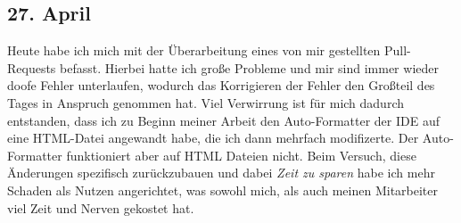 \subsection{27. April}
Heute habe ich mich mit der Überarbeitung eines von mir gestellten Pull-Requests befasst. Hierbei hatte ich große Probleme und mir sind immer wieder doofe Fehler unterlaufen, wodurch das Korrigieren der Fehler den Großteil des Tages in Anspruch genommen hat. Viel Verwirrung ist für mich dadurch entstanden, dass ich zu Beginn meiner Arbeit den Auto-Formatter der IDE auf eine HTML-Datei angewandt habe, die ich dann mehrfach modifizerte. Der Auto-Formatter funktioniert aber auf HTML Dateien nicht. Beim Versuch, diese Änderungen spezifisch zurückzubauen und dabei \textit{Zeit zu sparen} habe ich mehr Schaden als Nutzen angerichtet, was sowohl mich, als auch meinen Mitarbeiter viel Zeit und Nerven gekostet hat.